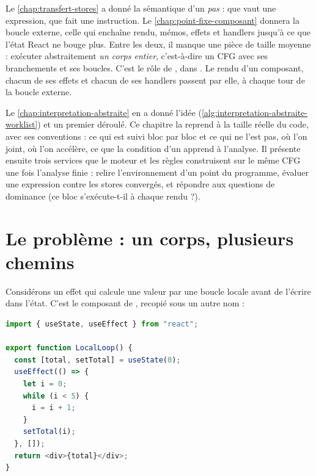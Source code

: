 
Le \cref{chap:transfert-stores} a donné la sémantique d'un \emph{pas} : que
vaut une expression, que fait une instruction. Le \cref{chap:point-fixe-composant}
donnera la boucle externe, celle qui enchaîne rendu, mémos, effets et handlers
jusqu'à ce que l'état React ne bouge plus. Entre les deux, il manque une pièce
de taille moyenne : exécuter abstraitement \emph{un corps entier}, c'est-à-dire
un CFG avec ses branchements et ses boucles. C'est le rôle de
, dans . Le rendu d'un
composant, chacun de ses effets et chacun de ses handlers passent par elle, à
chaque tour de la boucle externe.

Le \cref{chap:interpretation-abstraite} en a donné l'idée
(\cref{alg:interpretation-abstraite-worklist}) et un premier déroulé. Ce
chapitre la reprend à la taille réelle du code, avec ses conventions : ce qui
est suivi bloc par bloc et ce qui ne l'est pas, où l'on joint, où l'on
accélère, ce que la condition d'un  apprend à l'analyse. Il présente
ensuite trois services que le moteur et les règles construisent sur le même
CFG une fois l'analyse finie : relire l'environnement d'un point du programme,
évaluer une expression contre les stores convergés, et répondre aux questions
de dominance (\og ce bloc s'exécute-t-il à chaque rendu ?\fg).

\section{Le problème : un corps, plusieurs chemins}
\label{sec:cfg-analyzer-dominance-probleme}

Considérons un effet qui calcule une valeur par une boucle locale avant de
l'écrire dans l'état. C'est le composant  de
, recopié sous un autre nom :

\begin{lstlisting}[language=TypeScript,caption={Un effet avec une boucle locale (\file{/tmp/ch12/loop.tsx})},label={lst:cfg-analyzer-dominance-loop}]
import { useState, useEffect } from "react";

export function LocalLoop() {
  const [total, setTotal] = useState(0);
  useEffect(() => {
    let i = 0;
    while (i < 5) {
      i = i + 1;
    }
    setTotal(i);
  }, []);
  return <div>{total}</div>;
}
\end{lstlisting}

